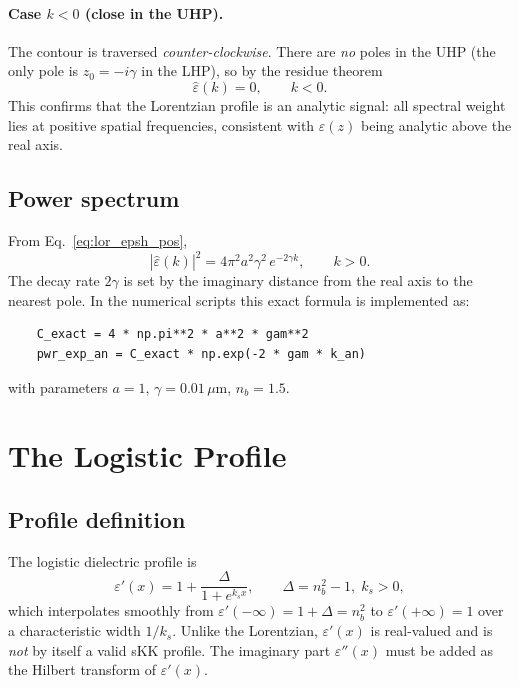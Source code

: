 \documentclass[11pt]{article}
\newcommand{\kk}{k_s}
\newcommand{\gam}{\gamma}
\newcommand{\eps}{\varepsilon}
\newcommand{\epsh}{\hat{\varepsilon}}
\begin{document}
\paragraph{Case $k < 0$ (close in the UHP).}
The contour is traversed \emph{counter-clockwise}. There are \emph{no} poles
in the UHP (the only pole is $z_0=-i\gam$ in the LHP), so by the residue
theorem
\begin{equation}
    \epsh(k) = 0, \qquad k < 0.
\end{equation}
This confirms that the Lorentzian profile is an analytic signal: all spectral
weight lies at positive spatial frequencies, consistent with $\eps(z)$ being
analytic above the real axis.

\subsection{Power spectrum}

From Eq.~\eqref{eq:lor_epsh_pos},
\begin{equation}\label{eq:lor_power}
    \boxed{|\epsh(k)|^2 = 4\pi^2 a^2 \gam^2\, e^{-2\gam k}, \qquad k > 0.}
\end{equation}
The decay rate $2\gam$ is set by the imaginary distance from the real axis to
the nearest pole. In the numerical scripts this exact formula is implemented as:
\begin{verbatim}
    C_exact = 4 * np.pi**2 * a**2 * gam**2
    pwr_exp_an = C_exact * np.exp(-2 * gam * k_an)
\end{verbatim}
with parameters $a=1$, $\gam=0.01\,\mu\mathrm{m}$, $n_b=1.5$.

\section{The Logistic Profile}

\subsection{Profile definition}

The logistic dielectric profile is
\begin{equation}\label{eq:log_profile}
    \eps'(x) = 1 + \frac{\Delta}{1 + e^{\kk x}},
    \qquad \Delta = n_b^2 - 1,\; \kk > 0,
\end{equation}
which interpolates smoothly from $\eps'(-\infty)=1+\Delta=n_b^2$ to
$\eps'(+\infty)=1$ over a characteristic width $1/\kk$.
Unlike the Lorentzian, $\eps'(x)$ is real-valued and is \emph{not} by itself
a valid sKK profile.  The imaginary part $\eps''(x)$ must be added as the
Hilbert transform of $\eps'(x)$.
\end{document}
